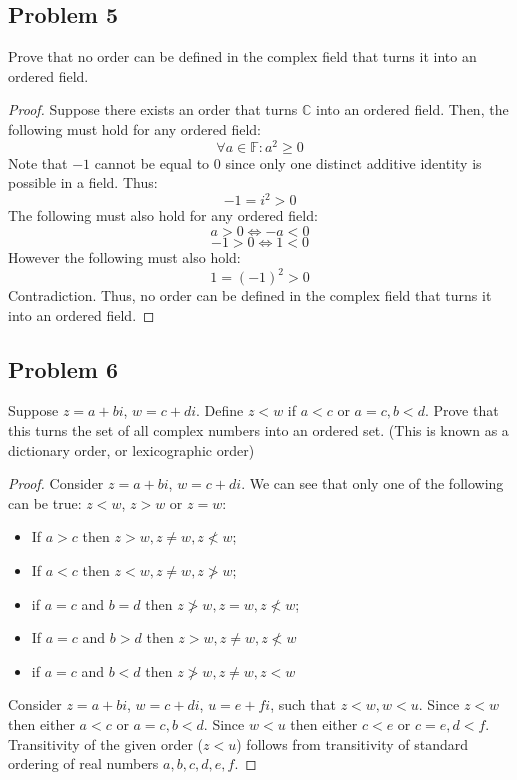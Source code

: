 \documentclass{article}
\newcommand{\C}{\mathbb{C}}
\begin{document}
\subsection*{Problem 5}

\begin{tcolorbox}
Prove that no order can be defined in the complex field that turns it into an ordered field.
\end{tcolorbox}

\begin{proof}
Suppose there exists an order that turns $\C$ into an ordered field.
Then, the following must hold for any ordered field:
$$\forall a \in \mathbb{F} : a^2 \geq 0$$
Note that $-1$ cannot be equal to $0$ since only one distinct additive identity is possible in a field. Thus:
$$-1 = i^2 > 0$$
 The following must also hold for any ordered field:
$$ a > 0 \iff -a < 0$$
$$ -1 > 0 \iff 1 < 0$$
However the following must also hold:
$$1 = (-1)^2 > 0$$
Contradiction. Thus, no order can be defined in the complex field that turns it into an ordered field.

\end{proof}

\subsection*{Problem 6}

\begin{tcolorbox}
Suppose $z = a + bi$, $w = c + di$. Define $z < w$ if $a < c$ or $a = c, b < d$. Prove that this turns the set of all complex numbers into an ordered set. (This is known as a dictionary order, or lexicographic order)
\end{tcolorbox}

\begin{proof}
Consider $z = a + bi$, $w = c + di$. We can see that only one of the following can be true: $z<w$, $z>w$ or $z=w$:
\begin{itemize}
\item If $a > c$ then $z>w, z \neq w, z \not< w$;
\item If $a < c$ then $z<w, z \neq w, z \not> w$;
\item if $a = c$ and $b = d$ then $z \not> w, z = w, z \not< w$;
\item If $a = c$ and $b > d$ then $z > w, z \neq w, z \not< w$
\item if $a = c$ and $b < d$ then $z \not> w, z \neq w, z < w$
\end{itemize}

Consider $z = a + bi$, $w = c + di$, $u = e + fi$, such that $z<w, w<u$. Since $z<w$  then either $a<c$ or $a=c, b<d$. Since $w<u$  then either $c<e$ or $c=e, d<f$. Transitivity of the given order ($z<u$) follows from transitivity of standard ordering of real numbers $a,b,c,d,e,f$.
\end{proof}
\end{document}
